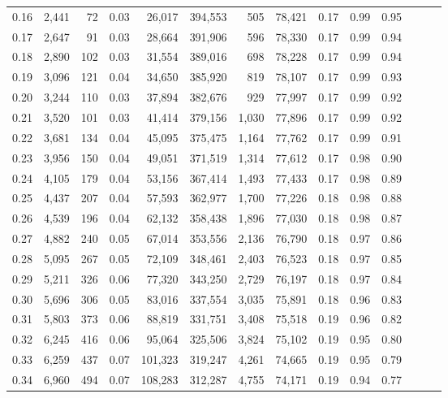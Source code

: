 \begin{tabular}{rrrrrrrrrrrrrr}
0.16 &  2,441 &     72 &  0.03 &   26,017 &  394,553 &     505 &  78,421 &  0.17 &  0.99 &      0.95 \\
0.17 &  2,647 &     91 &  0.03 &   28,664 &  391,906 &     596 &  78,330 &  0.17 &  0.99 &      0.94 \\
0.18 &  2,890 &    102 &  0.03 &   31,554 &  389,016 &     698 &  78,228 &  0.17 &  0.99 &      0.94 \\
0.19 &  3,096 &    121 &  0.04 &   34,650 &  385,920 &     819 &  78,107 &  0.17 &  0.99 &      0.93 \\
0.20 &  3,244 &    110 &  0.03 &   37,894 &  382,676 &     929 &  77,997 &  0.17 &  0.99 &      0.92 \\
0.21 &  3,520 &    101 &  0.03 &   41,414 &  379,156 &   1,030 &  77,896 &  0.17 &  0.99 &      0.92 \\
0.22 &  3,681 &    134 &  0.04 &   45,095 &  375,475 &   1,164 &  77,762 &  0.17 &  0.99 &      0.91 \\
0.23 &  3,956 &    150 &  0.04 &   49,051 &  371,519 &   1,314 &  77,612 &  0.17 &  0.98 &      0.90 \\
0.24 &  4,105 &    179 &  0.04 &   53,156 &  367,414 &   1,493 &  77,433 &  0.17 &  0.98 &      0.89 \\
0.25 &  4,437 &    207 &  0.04 &   57,593 &  362,977 &   1,700 &  77,226 &  0.18 &  0.98 &      0.88 \\
0.26 &  4,539 &    196 &  0.04 &   62,132 &  358,438 &   1,896 &  77,030 &  0.18 &  0.98 &      0.87 \\
0.27 &  4,882 &    240 &  0.05 &   67,014 &  353,556 &   2,136 &  76,790 &  0.18 &  0.97 &      0.86 \\
0.28 &  5,095 &    267 &  0.05 &   72,109 &  348,461 &   2,403 &  76,523 &  0.18 &  0.97 &      0.85 \\
0.29 &  5,211 &    326 &  0.06 &   77,320 &  343,250 &   2,729 &  76,197 &  0.18 &  0.97 &      0.84 \\
0.30 &  5,696 &    306 &  0.05 &   83,016 &  337,554 &   3,035 &  75,891 &  0.18 &  0.96 &      0.83 \\
0.31 &  5,803 &    373 &  0.06 &   88,819 &  331,751 &   3,408 &  75,518 &  0.19 &  0.96 &      0.82 \\
0.32 &  6,245 &    416 &  0.06 &   95,064 &  325,506 &   3,824 &  75,102 &  0.19 &  0.95 &      0.80 \\
0.33 &  6,259 &    437 &  0.07 &  101,323 &  319,247 &   4,261 &  74,665 &  0.19 &  0.95 &      0.79 \\
0.34 &  6,960 &    494 &  0.07 &  108,283 &  312,287 &   4,755 &  74,171 &  0.19 &  0.94 &      0.77 \\

\end{tabular}
